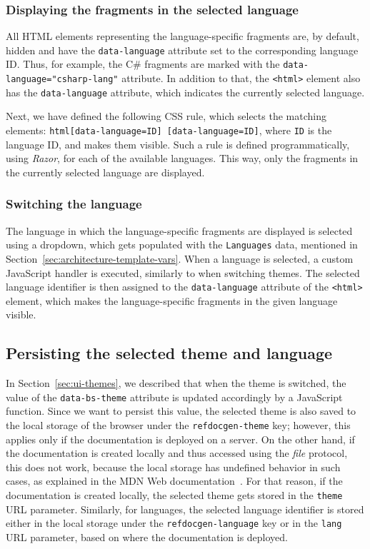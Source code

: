\subsubsection{Displaying the fragments in the selected language}
All HTML elements representing the language-specific fragments are, by default, hidden and have the \texttt{data-language} attribute set to the corresponding language ID.
Thus, for example, the C\# fragments are marked with the \texttt{data-language="csharp-lang"} attribute.
In addition to that, the \texttt{<html>} element also has the \texttt{data-language} attribute, which indicates the currently selected language.

Next, we have defined the following CSS rule, which selects the matching elements:
\texttt{html[data-language=ID] [data-language=ID]}, where \texttt{ID} is the language ID, and makes them visible.
Such a rule is defined programmatically, using \textit{Razor}, for each of the available languages.
This way, only the fragments in the currently selected language are displayed.

\subsubsection{Switching the language}
\label{sec:ui-langauge-switching}

The language in which the language-specific fragments are displayed is selected using a dropdown, which gets populated with the \texttt{Languages} data, mentioned in Section~\ref{sec:architecture-template-vars}. 
When a language is selected, a custom JavaScript handler is executed, similarly to when switching themes.
The selected language identifier is then assigned to the \texttt{data-language} attribute of the \texttt{<html>} element, which makes the language-specific fragments in the given language visible.

\subsection{Persisting the selected theme and language}

In Section~\ref{sec:ui-themes}, we described that when the theme is switched, the value of the \texttt{data-bs-theme} attribute is updated accordingly by a JavaScript function.
Since we want to persist this value, the selected theme is also saved to the local storage of the browser under the \texttt{refdocgen-theme} key; however, this applies only if the documentation is deployed on a server.
On the other hand, if the documentation is created locally and thus accessed using the \textit{file} protocol, this does not work, because the local storage has undefined behavior in such cases, as explained in the MDN Web documentation~\cite{mdn_localstorage}.
For that reason, if the documentation is created locally, the selected theme gets stored in the \texttt{theme} URL parameter.
Similarly, for languages, the selected language identifier is stored either in the local storage under the \texttt{refdocgen-language} key or in the \texttt{lang} URL parameter, based on where the documentation is deployed.


